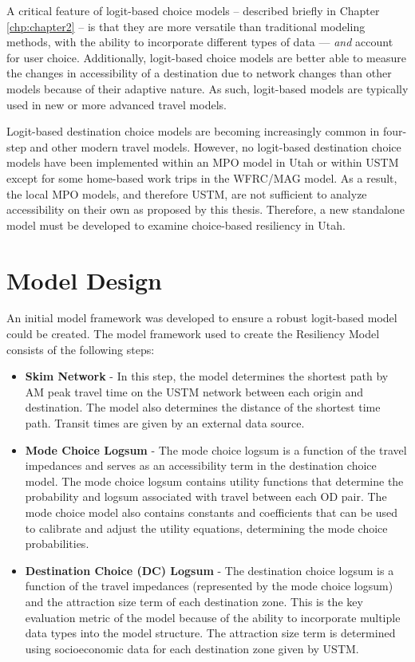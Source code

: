 A critical feature of logit-based choice models – described briefly in Chapter \ref{chp:chapter2} – is that they are more versatile than traditional modeling methods, with the ability to incorporate different types of data --- \textit{and} account for user choice. Additionally, logit-based choice models are better able to measure the changes in accessibility of a destination due to network changes than other models because of their adaptive nature. As such, logit-based models are typically used in new or more advanced travel models.

Logit-based destination choice models are becoming increasingly common in four-
step and other modern travel models. However, no logit-based destination
choice models have been implemented within an MPO model in Utah or within
USTM except for some home-based work trips in the WFRC/MAG model. As a result,
the local MPO models, and therefore USTM, are not sufficient to analyze
accessibility on their own as proposed by this thesis. Therefore, a new
standalone model must be developed to examine choice-based resiliency in Utah.

\section{Model Design} \label{Model Design}

An initial model framework was developed to ensure a robust logit-based model
could be created. The model framework used to create the Resiliency Model
consists of the following steps:

\begin{itemize}
	\item \textbf{Skim Network} - In this step, the model determines the shortest path by AM peak travel time on the USTM network between each origin and destination. The model also determines the distance of the shortest time path. Transit times are given by an external data source.
	\item \textbf{Mode Choice Logsum} - The mode choice logsum is a function of the travel impedances and serves as an accessibility term in the destination choice model. The mode choice logsum contains utility functions that determine the probability and logsum associated with travel between each OD pair. The mode choice model also contains constants and coefficients that can be used to calibrate and adjust the utility equations, determining the mode choice probabilities.
	\item \textbf{Destination Choice (DC) Logsum} - The destination choice logsum is a function of the travel impedances (represented by the mode choice logsum) and the attraction size term of each destination zone. This is the key evaluation metric of the model because of the ability to incorporate multiple data types into the model structure. The attraction size term is determined using socioeconomic data for each destination zone given by USTM.
	\end{itemize}

